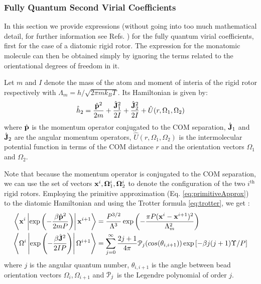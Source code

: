         \subsubsection{Fully Quantum Second Virial Coefficients}
            In this section we provide expressions (without going into too much mathematical detail, for further information see Refs. \cite{Cui1997,Patkowski2008,Garberoglio2009,Garberoglio2014}) for the fully quantum virial coefficients, first for the case of a diatomic rigid rotor. The expression for the monatomic molecule can then be obtained simply by ignoring the terms related to the orientational degrees of freedom in it.

            Let $m$ and $I$ denote the mass of the atom and moment of interia of the rigid rotor respectively with $\Lambda_m = h/\sqrt{2\pi m k_B T}$. Its Hamiltonian is given by:
            \begin{equation}
            \label{eq:hDiatomic}
                \hat{h}_2 = \displaystyle\frac{\hat{{\mathbf {p}}}^2}{2m} + \frac{\hat{{\mathbf {J}}}_1^2}{2I} + \frac{\hat{{\mathbf {J}}}_2^2}{2I} + \hat{U}(r,\Omega_1,\Omega_2)
            \end{equation}
            where $\hat{{\mathbf {p}}}$ is the momentum operator conjugated to the COM separation, $\hat{{\mathbf {J}}}_1$ and $\hat{{\mathbf {J}}}_2$ are the angular momentum operators, $\hat{U}(r,\Omega_1,\Omega_2)$ is the intermolecular potential function in terms of the COM distance $r$ and the orientation vectors $\Omega_1$ and $\Omega_2$.

            Note that because the momentum operator is conjugated to the COM separation, we can use the set of vectors ${\mathbf {x}}^i,{\mathbf {\Omega}}_1^i, {\mathbf {\Omega}}_2^i$ to denote the configuration of the two $i^\text{th}$ rigid rotors. Employing the primitive approximation (Eq. \eqref{eq:primitiveApprox}) to the diatomic Hamiltonian and using the Trotter formula \ref{eq:trotter}, we get \cite{Cui1997}:
            \begin{equation}
                \begin{aligned}
                    \left< {\mathbf {x}}^i \left| \exp \left(-\displaystyle\frac{\beta \hat{{\mathbf {p}}}^2}{2 m P} \right) \right| {\mathbf {x}}^{i+1} \right> &= \displaystyle\frac{P^{3/2}}{\Lambda^3} \exp \left(-\displaystyle\frac{\pi P ({\mathbf {x}}^i - {\mathbf {x}}^{i+1})^2}{\Lambda_m^2}\right)\\
                    \left< \Omega^i \left| \exp \left(-\displaystyle\frac{\beta \hat{{\mathbf {J}}}^2}{2IP} \right) \right| \Omega^{i+1} \right> &= \displaystyle\sum_{j=0}^\infty \frac{2j+1}{4 \pi} \mathcal{P}_j (cos (\theta_{i,i+1}))\nonumber \exp \left[-\beta j(j+1) \Upsilon/ P \right]
                \end{aligned}
            \end{equation}
            where $j$ is the angular quantum number, $\theta_{i,i+1}$ is the angle between bead orientation vectors $\Omega_i, \Omega_{i+1}$ and $\mathcal{P}_j$ is the Legendre polynomial of order $j$.

